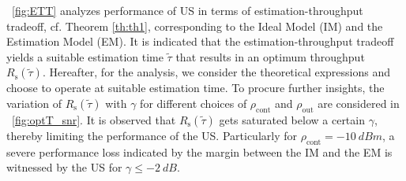 \documentclass[letterpaper, twocolumn]{IEEEtran}
\newcommand{\sub}[1]{_{\text{#1}}}
\newcommand{\opc}{\rho\sub{out}}
\newcommand{\pc}{\rho\sub{cont}}
\newcommand{\trs}{R\sub{s}}
\newcommand{\ttau}{\tilde{\tau}}
\begin{document}
\figurename~\ref{fig:ETT} analyzes performance of US in terms of estimation-throughput tradeoff, cf. Theorem \ref{th:th1}, corresponding to the Ideal Model (IM) and the Estimation Model (EM). %
It is indicated that the estimation-throughput tradeoff yields a suitable estimation time $\ttau$ that results in an optimum throughput $\trs(\ttau)$. Hereafter, for the analysis, we consider the theoretical expressions and choose to operate at suitable estimation time. To procure further insights, the variation of $\trs(\ttau)$ with $\gamma$ for different choices of $\pc$ and $\opc$ are considered in \figurename~\ref{fig:optT_snr}. It is observed that $\trs(\ttau)$ gets saturated below a certain $\gamma$, thereby limiting the performance of the US. Particularly for $\pc = \SI{-10}{dBm}$, a severe performance loss indicated by the margin between the IM and the EM is witnessed by the US for $\gamma \le \SI{-2}{dB}$. 
\end{document}
